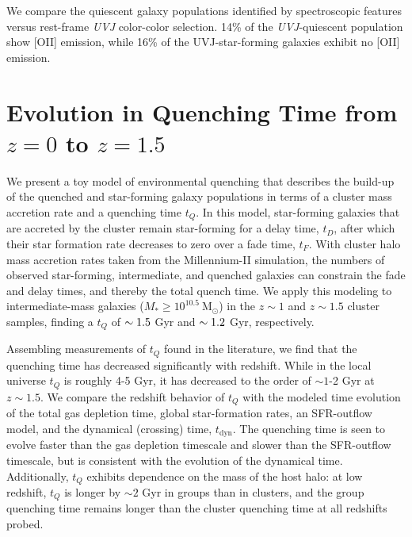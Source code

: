 We compare the quiescent galaxy populations identified by spectroscopic features versus rest-frame \textit{UVJ} color-color selection.
14\% of the \textit{UVJ}-quiescent population show [O\textsc{II}] emission, while 16\% of the UVJ-star-forming galaxies exhibit no [O\textsc{II}] emission.

\section{Evolution in Quenching Time from $z=0$ to $z=1.5$}

We present a toy model of environmental quenching that describes the build-up of the quenched and star-forming galaxy populations in terms of a cluster mass accretion rate and a quenching time $t_Q$.
In this model, star-forming galaxies that are accreted by the cluster remain star-forming for a delay time, $t_D$, after which their star formation rate decreases to zero over a fade time, $t_F$.
With cluster halo mass accretion rates taken from the Millennium-\textsc{II} simulation, the numbers of observed star-forming, intermediate, and quenched galaxies can constrain the fade and delay times, and thereby the total quench time.
We apply this modeling to intermediate-mass galaxies ($M_* \geq 10^{10.5}~\mathrm{M}_\odot$) in the $z\sim1$ and $z\sim1.5$ cluster samples, finding a $t_Q$ of $\sim1.5$ Gyr and $\sim1.2$ Gyr, respectively.

Assembling measurements of $t_Q$ found in the literature, we find that the quenching time has decreased significantly with redshift.
While in the local universe $t_Q$ is roughly 4-5 Gyr, it has decreased to the order of $\sim1$-2 Gyr at $z\sim1.5$.
We compare the redshift behavior of $t_Q$ with the modeled time evolution of the total gas depletion time, global star-formation rates, an SFR-outflow model, and the dynamical (crossing) time, $t_\mathrm{dyn}$.
The quenching time is seen to evolve faster than the gas depletion timescale and slower than the SFR-outflow timescale, but is consistent with the evolution of the dynamical time.
Additionally, $t_Q$ exhibits dependence on the mass of the host halo: at low redshift, $t_Q$ is longer by $\sim2$ Gyr in groups than in clusters, and the group quenching time remains longer than the cluster quenching time at all redshifts probed.

